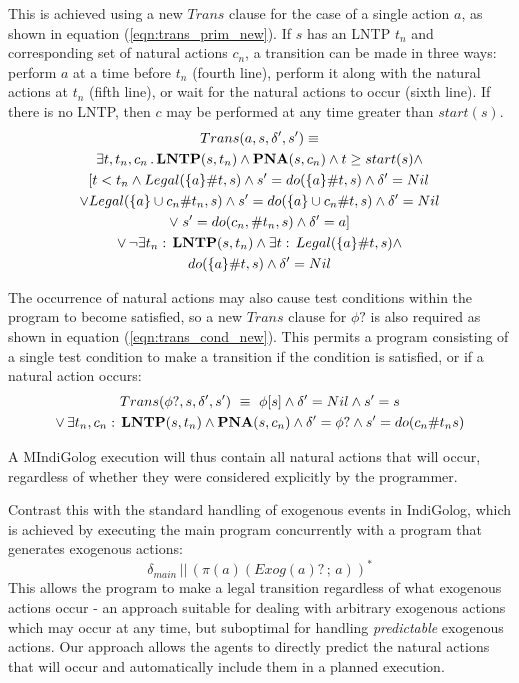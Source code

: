 This is achieved using a new $Trans$ clause for the case of a single
action $a$, as shown in equation (\ref{eqn:trans_prim_new}). If
$s$ has an LNTP $t_{n}$ and corresponding set of natural actions
$c_{n}$, a transition can be made in three ways: perform $a$ at
a time before $t_{n}$ (fourth line), perform it along with the natural
actions at $t_{n}$ (fifth line), or wait for the natural actions
to occur (sixth line). If there is no LNTP, then $c$ may be performed
at any time greater than $start(s)$.\begin{multline}
Trans(a,s,\delta',s')\equiv\\
\exists t,t_{n},c_{n}\,.\,\mathbf{LNTP}(s,t_{n})\wedge\mathbf{PNA}(s,c_{n})\wedge t\geq start(s)\wedge\\
\left[t<t_{n}\wedge Legal(\{a\}\#t,s)\wedge s'=do(\{a\}\#t,s)\wedge\delta'=Nil\right.\\
\vee Legal(\{a\}\cup c_{n}\#t_{n},s)\wedge s'=do(\{a\}\cup c_{n}\#t,s)\wedge\delta'=Nil\\
\vee\left.s'=do(c_{n},\#t_{n},s)\wedge\delta'=a\right]\\
\vee\,\neg\exists t_{n}:\,\mathbf{LNTP}(s,t_{n})\wedge\exists t:\, Legal(\{a\}\#t,s)\wedge\\
do(\{a\}\#t,s)\wedge\delta'=Nil\label{eqn:trans_prim_new}\end{multline}


The occurrence of natural actions may also cause test conditions within
the program to become satisfied, so a new $Trans$ clause for $\phi?$
is also required as shown in equation (\ref{eqn:trans_cond_new}).
This permits a program consisting of a single test condition to make
a transition if the condition is satisfied, or if a natural action
occurs: \begin{multline}
Trans(\phi?,s,\delta',s')\,\,\equiv\,\,\phi[s]\wedge\delta'=Nil\wedge s'=s\\
\vee\,\exists t_{n},c_{n}:\,\mathbf{LNTP}(s,t_{n})\wedge\mathbf{PNA}(s,c_{n})\wedge\delta'=\phi?\wedge s'=do(c_{n}\#t_{n}s)\label{eqn:trans_cond_new}\end{multline}


A MIndiGolog execution will thus contain all natural actions that
will occur, regardless of whether they were considered explicitly
by the programmer.

Contrast this with the standard handling of exogenous events in IndiGolog,
which is achieved by executing the main program concurrently with
a program that generates exogenous actions:\[
\delta_{main}\,||\,\left(\pi(a)(Exog(a)?\,;\, a)\right)^{*}\]
 This allows the program to make a legal transition regardless of
what exogenous actions occur - an approach suitable for dealing with
arbitrary exogenous actions which may occur at any time, but suboptimal
for handling \emph{predictable} exogenous actions. Our approach allows
the agents to directly predict the natural actions that will occur
and automatically include them in a planned execution.


